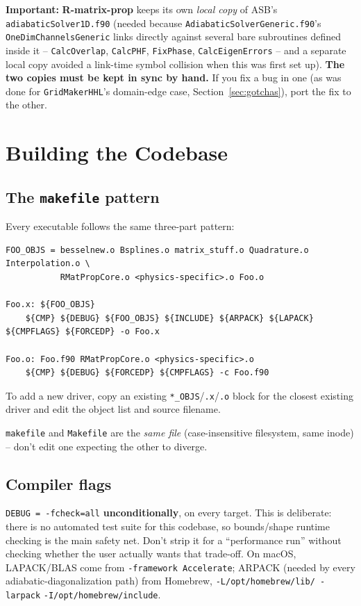 \documentclass[11pt]{article}
\newcommand{\file}[1]{\texttt{#1}}
\newcommand{\sub}[1]{\texttt{#1}}
\newcommand{\repo}[1]{\textbf{#1}}
\begin{document}
\textbf{Important:} \repo{R-matrix-prop} keeps its own \emph{local copy} of ASB's
\file{adiabaticSolver1D.f90} (needed because \file{AdiabaticSolverGeneric.f90}'s
\sub{OneDimChannelsGeneric} links directly against several bare subroutines defined inside it --
\sub{CalcOverlap}, \sub{CalcPHF}, \sub{FixPhase}, \sub{CalcEigenErrors} -- and a separate local
copy avoided a link-time symbol collision when this was first set up). \textbf{The two copies must
be kept in sync by hand.} If you fix a bug in one (as was done for \sub{GridMakerHHL}'s
domain-edge case, Section~\ref{sec:gotchas}), port the fix to the other.

\section{Building the Codebase}
\label{sec:build}

\subsection{The \texttt{makefile} pattern}

Every executable follows the same three-part pattern:
\begin{lstlisting}
FOO_OBJS = besselnew.o Bsplines.o matrix_stuff.o Quadrature.o Interpolation.o \
           RMatPropCore.o <physics-specific>.o Foo.o

Foo.x: ${FOO_OBJS}
	${CMP} ${DEBUG} ${FOO_OBJS} ${INCLUDE} ${ARPACK} ${LAPACK} ${CMPFLAGS} ${FORCEDP} -o Foo.x

Foo.o: Foo.f90 RMatPropCore.o <physics-specific>.o
	${CMP} ${DEBUG} ${FORCEDP} ${CMPFLAGS} -c Foo.f90
\end{lstlisting}
To add a new driver, copy an existing \texttt{*\_OBJS}/\texttt{.x}/\texttt{.o} block for the
closest existing driver and edit the object list and source filename.

\texttt{makefile} and \texttt{Makefile} are the \emph{same file} (case-insensitive filesystem,
same inode) -- don't edit one expecting the other to diverge.

\subsection{Compiler flags}

\texttt{DEBUG = -fcheck=all} \textbf{unconditionally}, on every target. This is deliberate: there
is no automated test suite for this codebase, so bounds/shape runtime checking is the main safety
net. Don't strip it for a ``performance run'' without checking whether the user actually wants
that trade-off. On macOS, LAPACK/BLAS come from \texttt{-framework Accelerate}; ARPACK (needed by
every adiabatic-diagonalization path) from Homebrew, \texttt{-L/opt/homebrew/lib/ -larpack}
\texttt{-I/opt/homebrew/include}.
\end{document}

